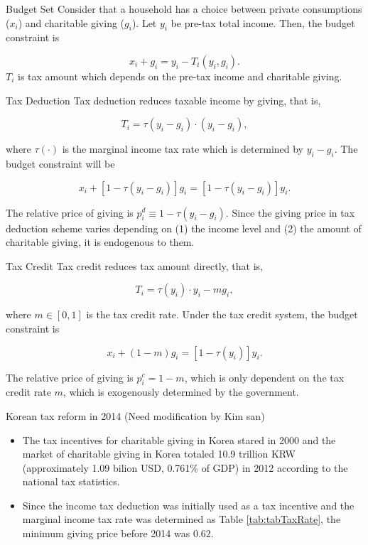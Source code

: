 \documentclass[
  ignorenonframetext,
]{beamer}
\providecommand{\tightlist}{%
  \setlength{\itemsep}{0pt}\setlength{\parskip}{0pt}}
\begin{document}
\begin{frame}{Budget Set}
\protect\hypertarget{budget-set}{}
Consider that a household has a choice between private consumptions (\(x_i\)) and charitable giving (\(g_i\)). Let \(y_i\) be pre-tax total income.
Then, the budget constraint is

\[
    x_i + g_i = y_i - T_i(y_i, g_i).
\]
\(T_i\) is tax amount which depends on the pre-tax income and charitable giving.
\end{frame}

\begin{frame}{Tax Deduction}
\protect\hypertarget{tax-deduction}{}
Tax deduction reduces taxable income by giving, that is,

\[
    T_i = \tau(y_i - g_i) \cdot (y_i - g_i),
\]

where \(\tau(\cdot)\) is the marginal income tax rate which is determined by \(y_i - g_i\). The budget constraint will be

\[
    x_i + [1 - \tau(y_i - g_i)]g_i = [1 - \tau(y_i - g_i)] y_i.
\]

The relative price of giving is \(p_i^{d} \equiv 1 - \tau(y_i - g_i)\).
Since the giving price in tax deduction scheme varies depending on (1) the income level and (2) the amount of charitable giving, it is endogenous to them.
\end{frame}

\begin{frame}{Tax Credit}
\protect\hypertarget{tax-credit}{}
Tax credit reduces tax amount directly, that is,

\[
    T_i = \tau(y_i)\cdot y_i - m g_i,
\]

where \(m \in [0, 1]\) is the tax credit rate. Under the tax credit system, the budget constraint is

\[
    x_i + (1 - m) g_i = [1 - \tau(y_i)] y_i.
\]

The relative price of giving is \(p_i^c = 1 - m\),
which is only dependent on the tax credit rate \(m\), which is exogenously determined by the government.
\end{frame}

\begin{frame}{Korean tax reform in 2014 (Need modification by Kim san)}
\protect\hypertarget{korean-tax-reform-in-2014-need-modification-by-kim-san}{}
\begin{itemize}
\tightlist
\item
  The tax incentives for charitable giving in Korea stared in 2000 and the market of charitable giving in Korea totaled 10.9 trillion KRW (approximately 1.09 bilion USD, 0.761\% of GDP) in 2012 according to the national tax statistics.
\item
  Since the income tax deduction was initially used as a tax incentive and the marginal income tax rate was determined as Table \ref{tab:tabTaxRate}, the minimum giving price before 2014 was 0.62.
\end{itemize}
\end{frame}
\end{document}
